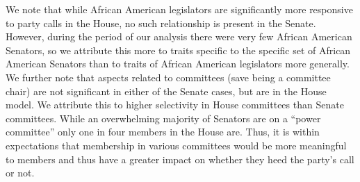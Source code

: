\documentclass[12pt]{article}
\begin{document}
We note that while African American legislators are significantly more responsive to party calls in the House, no such relationship is present in the Senate. However, during the period of our analysis there were very few African American Senators, so we attribute this more to traits specific to the specific set of African American Senators than to traits of African American legislators more generally. We further note that aspects related to committees (save being a committee chair) are not significant in either of the Senate cases, but are in the House model. We attribute this to higher selectivity in House committees than Senate committees. While an overwhelming majority of Senators are on a ``power committee'' only one in four members in the House are. Thus, it is within expectations that membership in various committees would be more meaningful to members and thus have a greater impact on whether they heed the party's call or not.
\end{document}
